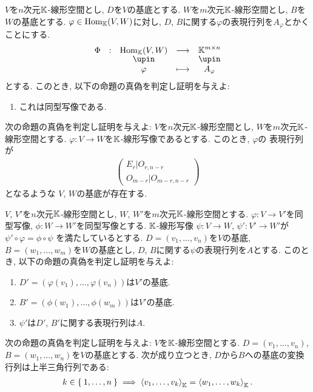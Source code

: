 \begin{quiz}
    $V$を$n$次元$\mathbb{K}$-線形空間とし,
  $D$を$V$の基底とする.
  $W$を$m$次元$\mathbb{K}$-線形空間とし,
  $B$を$W$の基底とする.
  $\varphi\in \operatorname{Hom}_{\mathbb{K}}(V,W)$に対し,
  $D$, $B$に関する$\varphi$の表現行列を$A_\varphi$とかくことにする.
  \begin{align*}
    \shazo{\Phi}{\Hom_\KK(V,W)}{\KK^{m\times n}}
    {\varphi}{A_\varphi}
  \end{align*}
  とする.
  このとき,
  以下の命題の真偽を判定し証明を与えよ:
  \begin{enumerate}
  \item これは同型写像である.
  \end{enumerate}
\end{quiz}


\begin{quiz}
  次の命題の真偽を判定し証明を与えよ:
  $V$を$n$次元$\mathbb{K}$-線形空間とし,
  $W$を$m$次元$\mathbb{K}$-線形空間とする.
  $\varphi\colon V\to W$を$\mathbb{K}$-線形写像であるとする.
  このとき,
  $\varphi$の
  表現行列が
  \begin{align*}
    \left(
    \begin{array}{c|c}
      E_r|O_{r,n-r}\\\hline
      O_{m-r}|O_{m-r,n-r}
    \end{array}
    \right)
  \end{align*}
  となるような
  $V$, $W$の基底が存在する.
\end{quiz}

\begin{quiz}
  $V$, $V'$を$n$次元$\mathbb{K}$-線形空間とし,
  $W$, $W'$を$m$次元$\mathbb{K}$-線形空間とする.
  $\varphi\colon V\to V'$を同型写像,
  $\phi\colon W\to W'$を同型写像とする.
  $\mathbb{K}$-線形写像
  $\psi\colon V\to W$,
  $\psi'\colon V'\to W'$が
  $\psi'\circ\varphi=\phi\circ\psi$
  を満たしているとする.
  $D=(v_1,\ldots,v_n)$を$V$の基底,
  $B=(w_1,\ldots,w_m)$を$W$の基底とし,
  $D$, $B$に関する$\psi$の表現行列を$A$とする.
  このとき,
  以下の命題の真偽を判定し証明を与えよ:
  \begin{enumerate}
  \item $D'=(\varphi(v_1),\ldots,\varphi(v_n))$は$V'$の基底.
  \item $B'=(\phi(w_1),\ldots,\phi(w_m))$は$V'$の基底.
  \item $\psi'$は$D'$, $B'$に関する表現行列は$A$.
  \end{enumerate}
\end{quiz}

\begin{quiz}
  次の命題の真偽を判定し証明を与えよ:
  $V$を$\mathbb{K}$-線形空間とする.
  $D=(v_1,\ldots,v_n)$,
  $B=(w_1,\ldots,w_n)$を$V$の基底とする.
  次が成り立つとき, $D$から$B$への基底の変換行列は上半三角行列である:
  \begin{align*}
    k\in\Set{1,\ldots,n}\implies \Braket{v_1,\ldots,v_k}_{\mathbb{K}}=\Braket{w_1,\ldots,w_k}_{\mathbb{K}}.
  \end{align*}
\end{quiz}

